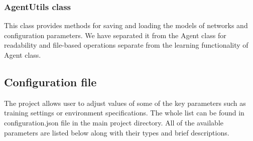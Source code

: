 \documentclass{article}
\begin{document}
\subsubsection{AgentUtils class}
This class provides methods for saving and loading the models of networks and configuration parameters. We have separated it from the Agent class for readability and file-based operations separate from the learning functionality of Agent class.

\subsection{Configuration file}
The project allows user to adjust values of some of the key parameters such as training settings or environment specifications. The whole list can be found in configuration.json file in the main project directory. All of the available parameters are listed below along with their types and brief descriptions.
\end{document}
